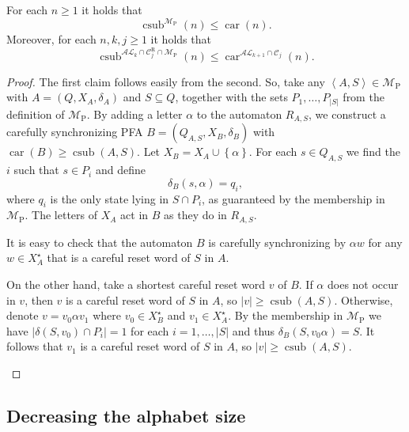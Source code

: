 \documentclass{ws-ijmpc}
\DeclareMathOperator{\car}{car}
\DeclareMathOperator{\csub}{csub}
\begin{document}
\begin{lemma}
\label{lem:sub->car}For each $n\ge1$ it holds that
\[
\csub^{\mathcal{M}_{\mathrm{P}}}\!\left(n\right)\le\car\!\left(n\right).
\]
Moreover, for each $n,k,j\ge1$ it holds that 
\[
\csub^{\mathcal{AL}_{k}\cap\mathcal{C}_{j}^{\mathrm{R}}\cap\mathcal{M}_{\mathrm{P}}}\!\left(n\right)\le\car^{\mathcal{AL}_{k+1}\cap\mathcal{C}_{j}}\!\left(n\right).
\]
\end{lemma}
\begin{proof}
The first claim follows easily from the second. So, take any $\left\langle A,S\right\rangle \in\mathcal{M}_{\mathrm{P}}$
with $A=\left(Q,X_{A},\delta_{A}\right)$ and $S\subseteq Q$, together
with the sets $P_{1},\dots,P_{\left|S\right|}$ from the definition
of $\mathcal{M}_{\mathrm{P}}$. By adding a letter $\alpha$ to the
automaton $R_{A,S}$, we construct a carefully synchronizing PFA $B=\left(Q_{A,S},X_{B},\delta_{B}\right)$
with $\car\!\left(B\right)\ge\csub\!\left(A,S\right)$. Let $X_{B}=X_{A}\cup\left\{ \alpha\right\} .$
For each $s\in Q_{A,S}$ we find the $i$ such that $s\in P_{i}$
and define 
\[
\delta_{B}\!\left(s,\alpha\right)=q_{i},
\]
where $q_{i}$ is the only state lying in $S\cap P_{i}$, as guaranteed
by the membership in $\mathcal{M}_{\mathrm{P}}$. The letters of $X_{A}$
act in $B$ as they do in $R_{A,S}$.
\begin{itemlist}
\item It is easy to check that the automaton $B$ is carefully synchronizing
by $\alpha w$ for any $w\in X_{A}^{\star}$ that is a careful reset
word of $S$ in $A$.
\item On the other hand, take a shortest careful reset word $v$ of $B$.
If $\alpha$ does not occur in $v$, then $v$ is a careful reset
word of $S$ in $A$, so $\left|v\right|\ge\csub\left(A,S\right)$.
Otherwise, denote $v=v_{0}\alpha v_{1}$ where $v_{0}\in X_{B}^{\star}$
and $v_{1}\in X_{A}^{\star}$. By the membership in $\mathcal{M}_{\mathrm{P}}$
we have $\left|\delta\!\left(S,v_{0}\right)\cap P_{i}\right|=1$ for
each $i=1,\dots,\left|S\right|$ and thus $\delta_{B}\!\left(S,v_{0}\alpha\right)=S$.
It follows that $v_{1}$ is a careful reset word of $S$ in $A$,
so $\left|v\right|\ge\csub\left(A,S\right)$.
\end{itemlist}
\end{proof}

\subsection{Decreasing the alphabet size}
\end{document}
